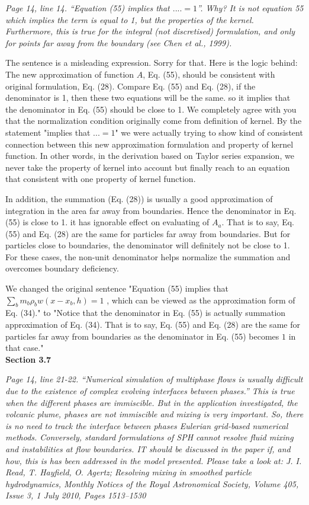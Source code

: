 \documentclass[10pt,a4paper]{article}
\begin{document}
\textit{Page 14, line 14. “Equation (55) implies that $. . ..=1$”. Why? It is not equation 55 which implies the term is equal to 1, but the properties of the kernel. Furthermore, this is
true for the integral (not discretised) formulation, and only for points far away from the boundary (see Chen et al., 1999).}

The sentence is a misleading expression. Sorry for that. Here is the logic behind: The new approximation of function $A$, Eq. (55), should be consistent with original formulation, Eq. (28). Compare Eq. (55) and Eq. (28), if the denominator is 1, then these two equations will be the same. so it implies that the denominator in Eq. (55) should be close to 1. 
We completely agree with you that the normalization condition originally come from definition of kernel. By the statement "implies that $...=1$" we were actually trying to show kind of consistent connection between this new approximation formulation and property of kernel function. In other words, in the derivation based on Taylor series expansion, we never take the property of kernel into account but finally reach to an equation that consistent with one property of kernel function.

In addition, the summation (Eq. (28)) is usually a good approximation of integration in the area far away from boundaries. Hence the denominator in Eq. (55) is close to 1. it has ignorable effect on evaluating of $A_a$. That is to say, Eq. (55) and Eq. (28) are the same for particles far away from boundaries. But for particles close to boundaries, the denominator will definitely not be close to 1. For these cases, the non-unit denominator helps normalize the summation and overcomes boundary deficiency.

We changed the original sentence "Equation (55) implies that $\sum_b	m_b \rho_b w (x-x_b, h) = 1$ , which can be viewed as the approximation form of Eq. (34)." to  "Notice that the denominator in Eq. (55) is actually summation approximation of Eq. (34). That is to say, Eq. (55) and Eq. (28) are the same for particles far away from boundaries as the denominator in Eq. (55) becomes $1$ in that case." \\[6pt]

\textbf{Section 3.7}

\textit{Page 14, line 21-22. “Numerical simulation of multiphase flows is usually difficult due to the existence of complex evolving interfaces between phases.”
This is true when the different phases are immiscible. But in the application investigated, the volcanic plume, phases are not immiscible and mixing is very important. So, there is no need to track the interface between phases Eulerian grid-based numerical methods. Conversely, standard formulations of SPH cannot resolve fluid mixing and instabilities at flow boundaries. IT should be discussed in the paper if, and how, this is has been addressed in the model presented. Please take a look at: J. I. Read, T. Hayfield, O. Agertz; Resolving mixing in smoothed particle hydrodynamics, Monthly Notices of the Royal Astronomical Society, Volume 405, Issue 3, 1 July 2010, Pages 1513–1530}
\end{document}
